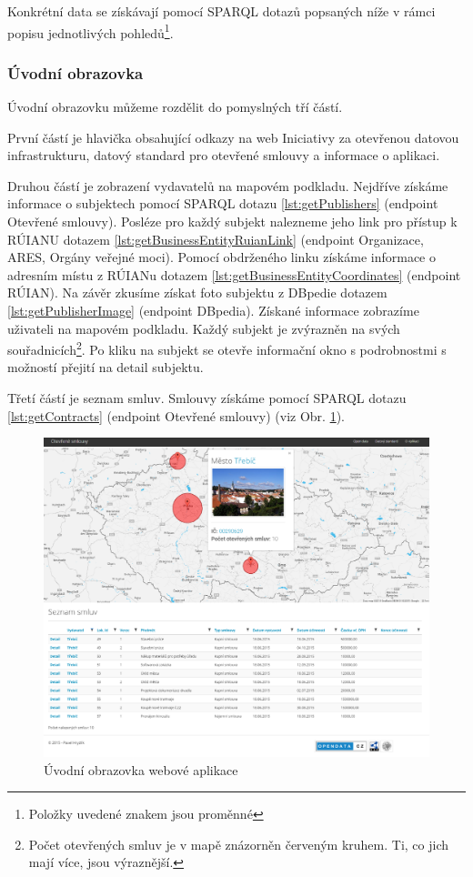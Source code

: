 Konkrétní data se získávají pomocí SPARQL dotazů popsaných níže v rámci popisu jednotlivých pohledů\footnote{Položky uvedené znakem  jsou proměnné}.

\subsubsection*{Úvodní obrazovka}

Úvodní obrazovku můžeme rozdělit do pomyslných tří částí. 

První částí je hlavička obsahující odkazy na web Iniciativy za otevřenou datovou infrastrukturu\cite{od}, datový standard pro otevřené smlouvy\cite{metodika} a informace o aplikaci.

Druhou částí je zobrazení vydavatelů na mapovém podkladu. Nejdříve získáme informace o subjektech pomocí SPARQL dotazu \ref{lst:getPublishers} (endpoint Otevřené smlouvy). Posléze pro každý subjekt nalezneme jeho link pro přístup k RÚIANU dotazem \ref{lst:getBusinessEntityRuianLink} (endpoint Organizace, ARES, Orgány veřejné moci). Pomocí obdrženého linku získáme informace o adresním místu z RÚIANu dotazem \ref{lst:getBusinessEntityCoordinates} (endpoint RÚIAN). Na závěr zkusíme získat foto subjektu z DBpedie dotazem \ref{lst:getPublisherImage} (endpoint DBpedia). Získané informace zobrazíme uživateli na mapovém podkladu. Každý subjekt je zvýrazněn na svých souřadnicích\footnote{Počet otevřených smluv je v mapě znázorněn červeným kruhem. Ti, co jich mají více, jsou výraznější.}. Po kliku na subjekt se otevře informační okno s podrobnostmi s možností přejití na detail subjektu.

Třetí částí je seznam smluv. Smlouvy získáme pomocí SPARQL dotazu \ref{lst:getContracts} (endpoint Otevřené smlouvy) (viz Obr. \ref{obr:mainPage}).\\

\begin{figure}[H]
\centerline{\includegraphics[width=\textwidth]{img/webMainPage.eps}}
\caption{Úvodní obrazovka webové aplikace}
\label{obr:mainPage}
\end{figure}

